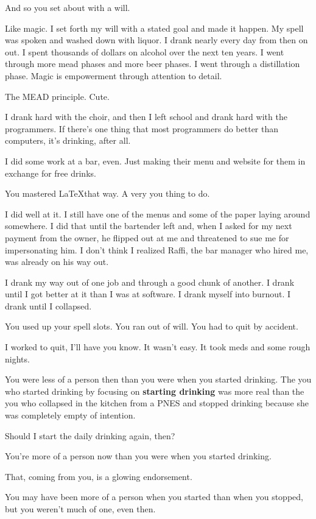 \begin{ally}
And so you set about with a will.
\end{ally}
Like magic. I set forth my will with a stated goal and made it happen. My spell was spoken and washed down with liquor. I drank nearly every day from then on out. I spent thousands of dollars on alcohol over the next ten years. I went through more mead phases and more beer phases. I went through a distillation phase. Magic is empowerment through attention to detail.

\begin{ally}
The MEAD principle. Cute.
\end{ally}
I drank hard with the choir, and then I left school and drank hard with the programmers. If there's one thing that most programmers do better than computers, it's drinking, after all.

I did some work at a bar, even. Just making their menu and website for them in exchange for free drinks.

\begin{ally}
You mastered \LaTeX that way. A very you thing to do.
\end{ally}
I did well at it. I still have one of the menus and some of the paper laying around somewhere. I did that until the bartender left and, when I asked for my next payment from the owner, he flipped out at me and threatened to sue me for impersonating him. I don't think I realized Raffi, the bar manager who hired me, was already on his way out.

I drank my way out of one job and through a good chunk of another. I drank until I got better at it than I was at software. I drank myself into burnout. I drank until I collapsed.

\begin{ally}
You used up your spell slots. You ran out of will. You had to quit by accident.
\end{ally}
I worked to quit, I'll have you know. It wasn't easy. It took meds and some rough nights.

\begin{ally}
You were less of a person then than you were when you started drinking. The you who started drinking by focusing on \textbf{starting drinking} was more real than the you who collapsed in the kitchen from a PNES and stopped drinking because she was completely empty of intention.
\end{ally}
Should I start the daily drinking again, then?

\begin{ally}
You're more of a person now than you were when you started drinking.
\end{ally}
That, coming from you, is a glowing endorsement.

\begin{ally}
You may have been more of a person when you started than when you stopped, but you weren't much of one, even then.
\end{ally}
\newpage
